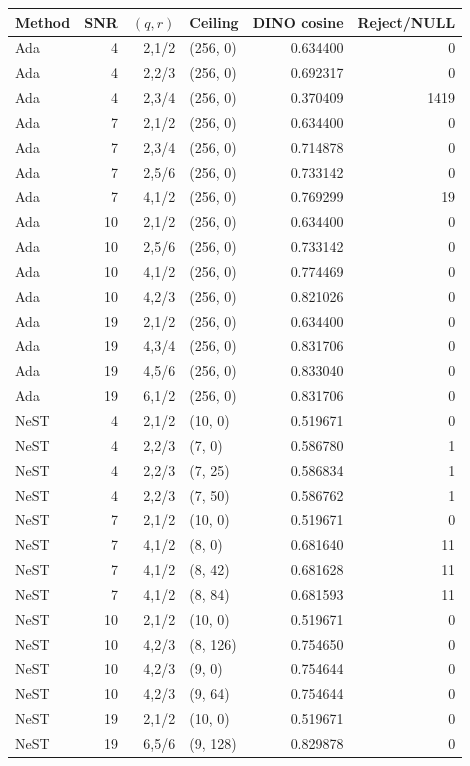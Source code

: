 \begin{longtable}{@{}lrrlrr@{}}\toprule
Method & SNR & $(q,r)$ & Ceiling & DINO cosine & Reject/NULL\\\midrule\endhead
Ada & 4 & 2,1/2 & (256, 0) & 0.634400 & 0\\
Ada & 4 & 2,2/3 & (256, 0) & 0.692317 & 0\\
Ada & 4 & 2,3/4 & (256, 0) & 0.370409 & 1419\\
Ada & 7 & 2,1/2 & (256, 0) & 0.634400 & 0\\
Ada & 7 & 2,3/4 & (256, 0) & 0.714878 & 0\\
Ada & 7 & 2,5/6 & (256, 0) & 0.733142 & 0\\
Ada & 7 & 4,1/2 & (256, 0) & 0.769299 & 19\\
Ada & 10 & 2,1/2 & (256, 0) & 0.634400 & 0\\
Ada & 10 & 2,5/6 & (256, 0) & 0.733142 & 0\\
Ada & 10 & 4,1/2 & (256, 0) & 0.774469 & 0\\
Ada & 10 & 4,2/3 & (256, 0) & 0.821026 & 0\\
Ada & 19 & 2,1/2 & (256, 0) & 0.634400 & 0\\
Ada & 19 & 4,3/4 & (256, 0) & 0.831706 & 0\\
Ada & 19 & 4,5/6 & (256, 0) & 0.833040 & 0\\
Ada & 19 & 6,1/2 & (256, 0) & 0.831706 & 0\\
NeST & 4 & 2,1/2 & (10, 0) & 0.519671 & 0\\
NeST & 4 & 2,2/3 & (7, 0) & 0.586780 & 1\\
NeST & 4 & 2,2/3 & (7, 25) & 0.586834 & 1\\
NeST & 4 & 2,2/3 & (7, 50) & 0.586762 & 1\\
NeST & 7 & 2,1/2 & (10, 0) & 0.519671 & 0\\
NeST & 7 & 4,1/2 & (8, 0) & 0.681640 & 11\\
NeST & 7 & 4,1/2 & (8, 42) & 0.681628 & 11\\
NeST & 7 & 4,1/2 & (8, 84) & 0.681593 & 11\\
NeST & 10 & 2,1/2 & (10, 0) & 0.519671 & 0\\
NeST & 10 & 4,2/3 & (8, 126) & 0.754650 & 0\\
NeST & 10 & 4,2/3 & (9, 0) & 0.754644 & 0\\
NeST & 10 & 4,2/3 & (9, 64) & 0.754644 & 0\\
NeST & 19 & 2,1/2 & (10, 0) & 0.519671 & 0\\
NeST & 19 & 6,5/6 & (9, 128) & 0.829878 & 0\\

\end{longtable}

